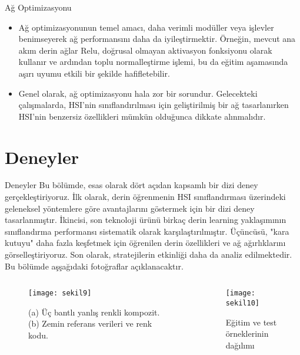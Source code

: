 \documentclass{beamer}
\begin{document}
\begin{frame}{Ağ Optimizasyonu}
\begin{itemize}
	\item Ağ optimizasyonunun temel amacı, daha verimli modüller veya işlevler benimseyerek ağ performansını daha da iyileştirmektir. Örneğin, mevcut ana akım derin ağlar Relu, doğrusal olmayan aktivasyon fonksiyonu olarak kullanır ve ardından toplu normalleştirme işlemi, bu da eğitim aşamasında aşırı uyumu etkili bir şekilde hafifletebilir.
	\item Genel olarak, ağ optimizasyonu hala zor bir sorundur. Gelecekteki çalışmalarda, HSI'nin sınıflandırılması için geliştirilmiş bir ağ tasarlanırken HSI'nin benzersiz özellikleri mümkün olduğunca dikkate alınmalıdır.
\end{itemize}
\end{frame}

\section{Deneyler}
\begin{frame}{Deneyler}
	Bu bölümde, esas olarak dört açıdan kapsamlı bir dizi deney gerçekleştiriyoruz. İlk olarak, derin öğrenmenin HSI sınıflandırması üzerindeki geleneksel yöntemlere göre avantajlarını göstermek için bir dizi deney tasarlanmıştır. İkincisi, son teknoloji ürünü birkaç derin learning yaklaşımının sınıflandırma performansı sistematik olarak karşılaştırılmıştır. Üçüncüsü, "kara kutuyu" daha fazla keşfetmek için öğrenilen derin özellikleri ve ağ ağırlıklarını görselleştiriyoruz. Son olarak, stratejilerin etkinliği daha da analiz edilmektedir. Bu bölümde aşşağıdaki fotoğraflar açıklanacaktır.
\end{frame}

\begin{frame}
	\begin{columns}
		\begin{column}{0.5\textwidth}
			\begin{figure}[]
				\centering
				\texttt{[image: sekil9]}
				\label{fig:sekil5}
				\caption{(a) Üç bantlı yanlış renkli kompozit. (b) Zemin referans verileri ve renk kodu.} 
			\end{figure}
		\end{column}
		\begin{column}{0.5\textwidth}
			\begin{figure}[]
				\centering
				\texttt{[image: sekil10]}
				\caption{Eğitim ve test örneklerinin dağılımı}
				\label{fig:sekil6}
			\end{figure}
		\end{column}
	\end{columns}
\end{frame}
\end{document}
